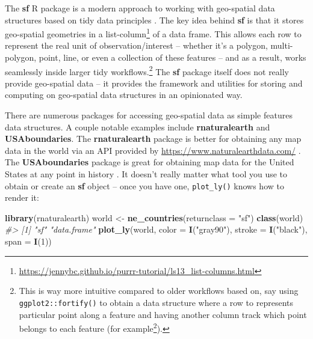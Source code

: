 \documentclass[
  12pt,
]{krantz}
\newenvironment{Shaded}{\begin{snugshade}}{\end{snugshade}}
\newcommand{\CommentTok}[1]{\textcolor[rgb]{0.56,0.35,0.01}{\textit{#1}}}
\newcommand{\DataTypeTok}[1]{\textcolor[rgb]{0.13,0.29,0.53}{#1}}
\newcommand{\DecValTok}[1]{\textcolor[rgb]{0.00,0.00,0.81}{#1}}
\newcommand{\KeywordTok}[1]{\textcolor[rgb]{0.13,0.29,0.53}{\textbf{#1}}}
\newcommand{\NormalTok}[1]{#1}
\newcommand{\StringTok}[1]{\textcolor[rgb]{0.31,0.60,0.02}{#1}}
\renewcommand{\href}[2]{#2\footnote{\url{#1}}}
\begin{document}
The \textbf{sf} R package is a modern approach to working with geo-spatial data structures based on tidy data principles \citep{sf, tidy-data}. The key idea behind \textbf{sf} is that it stores geo-spatial geometries in a \href{https://jennybc.github.io/purrr-tutorial/ls13_list-columns.html}{list-column} of a data frame. This allows each row to represent the real unit of observation/interest -- whether it's a polygon, multi-polygon, point, line, or even a collection of these features -- and as a result, works seamlessly inside larger tidy workflows.\footnote{This is way more intuitive compared to older workflows based on, say using \texttt{ggplot2::fortify()} to obtain a data structure where a row to represents particular point along a feature and having another column track which point belongs to each feature (\href{https://gis.stackexchange.com/questions/165974/r-fortify-causing-polygons-to-tear}{for example}).} The \textbf{sf} package itself does not really provide geo-spatial data -- it provides the framework and utilities for storing and computing on geo-spatial data structures in an opinionated way.

There are numerous packages for accessing geo-spatial data as simple features data structures. A couple notable examples include \textbf{rnaturalearth} and \textbf{USAboundaries}. The \textbf{rnaturalearth} package is better for obtaining any map data in the world via an API provided by \url{https://www.naturalearthdata.com/} \citep{rnaturalearth}. The \textbf{USAboundaries} package is great for obtaining map data for the United States at any point in history \citep{USAboundaries}. It doesn't really matter what tool you use to obtain or create an \textbf{sf} object -- once you have one, \texttt{plot\_ly()} knows how to render it:

\begin{Shaded}
\begin{Highlighting}[]
\KeywordTok{library}\NormalTok{(rnaturalearth)}
\NormalTok{world <-}\StringTok{ }\KeywordTok{ne_countries}\NormalTok{(}\DataTypeTok{returnclass =} \StringTok{"sf"}\NormalTok{)}
\KeywordTok{class}\NormalTok{(world)}
\CommentTok{#> [1] "sf"    "data.frame"}
\KeywordTok{plot_ly}\NormalTok{(world, }\DataTypeTok{color =} \KeywordTok{I}\NormalTok{(}\StringTok{"gray90"}\NormalTok{), }\DataTypeTok{stroke =} \KeywordTok{I}\NormalTok{(}\StringTok{"black"}\NormalTok{), }\DataTypeTok{span =} \KeywordTok{I}\NormalTok{(}\DecValTok{1}\NormalTok{))}
\end{Highlighting}
\end{Shaded}
\end{document}
